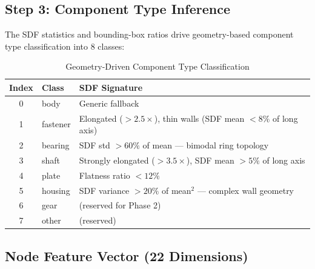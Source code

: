 \documentclass[12pt]{report}
\begin{document}
\subsection{Step 3: Component Type Inference}

The SDF statistics and bounding-box ratios drive geometry-based component type classification into 8 classes:

\begin{table}[H]
\centering
\caption{Geometry-Driven Component Type Classification}
\begin{tabular}{c l l}
\toprule
\textbf{Index} & \textbf{Class} & \textbf{SDF Signature} \\
\midrule
0 & body & Generic fallback \\
1 & fastener & Elongated ($>2.5\times$), thin walls (SDF mean $< 8\%$ of long axis) \\
2 & bearing & SDF std $> 60\%$ of mean --- bimodal ring topology \\
3 & shaft & Strongly elongated ($>3.5\times$), SDF mean $> 5\%$ of long axis \\
4 & plate & Flatness ratio $< 12\%$ \\
5 & housing & SDF variance $> 20\%$ of mean$^2$ --- complex wall geometry \\
6 & gear & (reserved for Phase 2) \\
7 & other & (reserved) \\
\bottomrule
\end{tabular}
\end{table}

\subsection{Node Feature Vector (22 Dimensions)}
\end{document}
